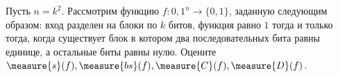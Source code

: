 Пусть $n = k^2$. Рассмотрим функцию $f\colon {0, 1}^n \rightarrow \{0, 1\}$, заданную следующим образом:
вход разделен на блоки по $k$ битов, функция равно $1$ тогда и только тогда, когда существует блок в
котором два последовательных бита равны единице, а остальные биты равны нулю. Оцените $\measure{s}(f),
\measure{bs}(f), \measure{C}(f), \measure{D}(f)$. 